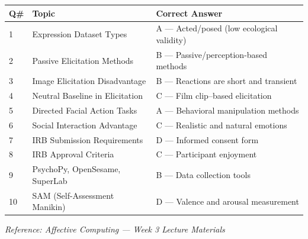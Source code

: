 \documentclass[11pt,a4paper]{article}
\newcommand{\bb}[1]{\textbf{#1}}
\begin{document}
\begin{center}
\renewcommand{\arraystretch}{1.4}
\begin{tabular}{|L{0.8cm}|L{6.2cm}|L{8.2cm}|}
\hline
\bb{Q\#} & \bb{Topic} & \bb{Correct Answer} \\
 & Expression Dataset Types & A --- Acted/posed (low ecological validity) \\
2 & Passive Elicitation Methods & B --- Passive/perception-based methods \\
3 & Image Elicitation Disadvantage & B --- Reactions are short and transient \\
4 & Neutral Baseline in Elicitation & C --- Film clip--based elicitation \\
5 & Directed Facial Action Tasks & A --- Behavioral manipulation methods \\
6 & Social Interaction Advantage & C --- Realistic and natural emotions \\
7 & IRB Submission Requirements & D --- Informed consent form \\
8 & IRB Approval Criteria & C --- Participant enjoyment \\
9 & PsychoPy, OpenSesame, SuperLab & B --- Data collection tools \\
10 & SAM (Self-Assessment Manikin) & D --- Valence and arousal measurement \\
\hline
\end{tabular}
\end{center}

\medskip
{\small\textit{Reference: Affective Computing --- Week 3 Lecture Materials}}
\end{document}
